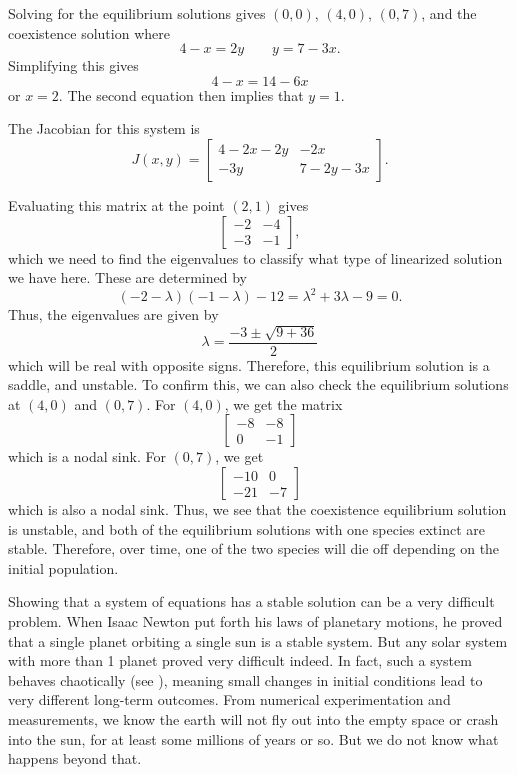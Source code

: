 \documentclass{ximera}
\begin{document}
\begin{exampleSol}
    Solving for the equilibrium solutions gives $(0,0)$, $(4, 0)$, $(0, 7)$, and the coexistence solution where
    \[ 
        4 - x = 2y \qquad y = 7-3x. 
    \] 
    Simplifying this gives
    \[ 
        4 - x = 14 - 6x 
    \] 
    or $x=2$. The second equation then implies that $y=1$. 
    
    The Jacobian for this system is 
    \[ 
        J(x,y) = 
        \begin{bmatrix} 
            4 - 2x - 2y & -2x \\ 
            -3y & 7 - 2y - 3x 
        \end{bmatrix}. 
    \]
    
    Evaluating this matrix at the point $(2,1)$ gives
    \[ 
        \begin{bmatrix} 
            -2 & -4 \\ 
            -3 & -1 
        \end{bmatrix}, 
    \] 
    which we need to find the eigenvalues to classify what type of linearized solution we have here. These are determined by
    \[ 
        (-2-\lambda)(-1-\lambda) - 12 = \lambda^2 + 3\lambda - 9 = 0.
    \] 
    Thus, the eigenvalues are given by
    \[ 
        \lambda = \frac{-3 \pm \sqrt{9 + 36}}{2} 
    \] 
    which will be real with opposite signs. Therefore, this equilibrium solution is a saddle, and unstable. To confirm this, we can also check the equilibrium solutions at $(4,0)$ and $(0,7)$. For $(4,0)$, we get the matrix
    \[ 
        \begin{bmatrix} 
            -8 & -8 \\ 
            0 & -1 
        \end{bmatrix} 
    \] 
    which is a nodal sink. For $(0,7)$, we get
    \[ 
        \begin{bmatrix} 
            -10 & 0 \\ 
            -21 & -7 
        \end{bmatrix} 
    \] 
    which is also a nodal sink. Thus, we see that the coexistence equilibrium solution is unstable, and both of the equilibrium solutions with one species extinct are stable. Therefore, over time, one of the two species will die off depending on the initial population.
\end{exampleSol} 


Showing that a system of equations has a stable solution can be a very difficult problem.  When Isaac Newton put forth his laws of planetary motions, he proved that a single planet orbiting a single sun is a stable system.  But any solar system with more than 1 planet proved very difficult indeed.  In fact, such a system behaves chaotically (see ), meaning small changes in initial conditions lead to very different long-term outcomes.  From numerical experimentation and measurements, we know the earth will not fly out into the empty space or crash into the sun, for at least some millions of years or so. But we do not know what happens beyond that.
\end{document}
